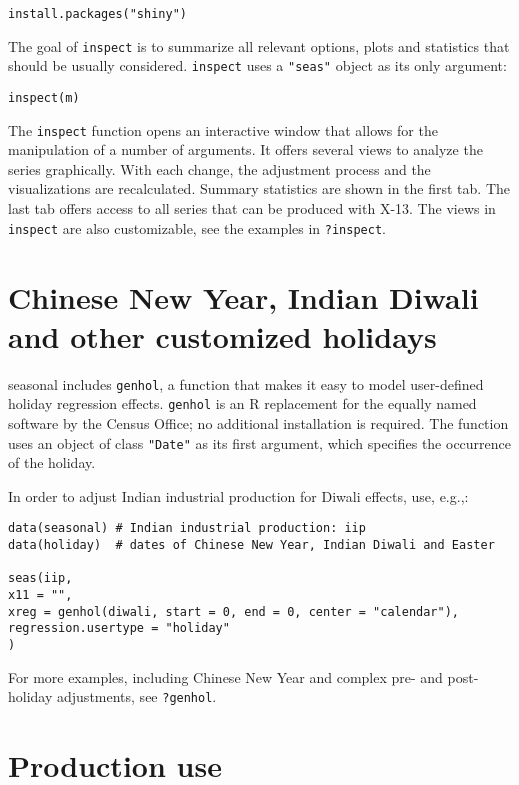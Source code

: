 \begin{verbatim}
install.packages("shiny")
\end{verbatim}

The goal of \texttt{inspect} is to summarize all relevant options, plots
and statistics that should be usually considered. \texttt{inspect} uses
a \texttt{"seas"} object as its only argument:

\begin{verbatim}
inspect(m)
\end{verbatim}

The \texttt{inspect} function opens an interactive window that allows
for the manipulation of a number of arguments. It offers several views
to analyze the series graphically. With each change, the adjustment
process and the visualizations are recalculated. Summary statistics are
shown in the first tab. The last tab offers access to all series that
can be produced with X-13. The views in \texttt{inspect} are also
customizable, see the examples in \texttt{?inspect}.

\section{Chinese New Year, Indian Diwali and other customized
holidays}\label{chinese-new-year-indian-diwali-and-other-customized-holidays}

seasonal includes \texttt{genhol}, a function that makes it easy to
model user-defined holiday regression effects. \texttt{genhol} is an R
replacement for the equally named software by the Census Office; no
additional installation is required. The function uses an object of
class \texttt{"Date"} as its first argument, which specifies the
occurrence of the holiday.

In order to adjust Indian industrial production for Diwali effects, use,
e.g.,:

\begin{verbatim}
data(seasonal) # Indian industrial production: iip
data(holiday)  # dates of Chinese New Year, Indian Diwali and Easter

seas(iip, 
x11 = "",
xreg = genhol(diwali, start = 0, end = 0, center = "calendar"), 
regression.usertype = "holiday"
)
\end{verbatim}

For more examples, including Chinese New Year and complex pre- and
post-holiday adjustments, see \texttt{?genhol}.

\section{Production use}\label{production-use}


